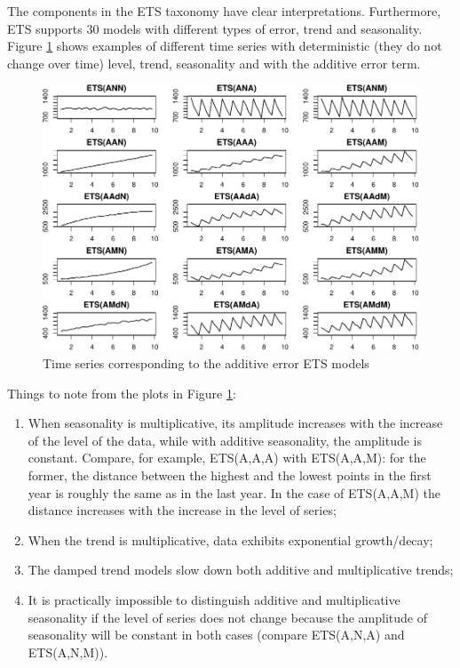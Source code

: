 \documentclass[
]{book}
\providecommand{\tightlist}{%
  \setlength{\itemsep}{0pt}\setlength{\parskip}{0pt}}
\theoremstyle{definition}
\theoremstyle{definition}
\theoremstyle{definition}
\theoremstyle{definition}
\theoremstyle{remark}
\begin{document}
The components in the ETS taxonomy have clear interpretations. Furthermore, ETS supports 30 models with different types of error, trend and seasonality. Figure \ref{fig:ETSTaxonomyAdditive} shows examples of different time series with deterministic (they do not change over time) level, trend, seasonality and with the additive error term.

\begin{figure}
\centering
\includegraphics{Svetunkov--2022----ADAM_files/figure-latex/ETSTaxonomyAdditive-1.pdf}
\caption{\label{fig:ETSTaxonomyAdditive}Time series corresponding to the additive error ETS models}
\end{figure}

Things to note from the plots in Figure \ref{fig:ETSTaxonomyAdditive}:

\begin{enumerate}
\def\labelenumi{\arabic{enumi}.}
\tightlist
\item
  When seasonality is multiplicative, its amplitude increases with the increase of the level of the data, while with additive seasonality, the amplitude is constant. Compare, for example, ETS(A,A,A) with ETS(A,A,M): for the former, the distance between the highest and the lowest points in the first year is roughly the same as in the last year. In the case of ETS(A,A,M) the distance increases with the increase in the level of series;
\item
  When the trend is multiplicative, data exhibits exponential growth/decay;
\item
  The damped trend models slow down both additive and multiplicative trends;
\item
  It is practically impossible to distinguish additive and multiplicative seasonality if the level of series does not change because the amplitude of seasonality will be constant in both cases (compare ETS(A,N,A) and ETS(A,N,M)).
\end{enumerate}
\end{document}
